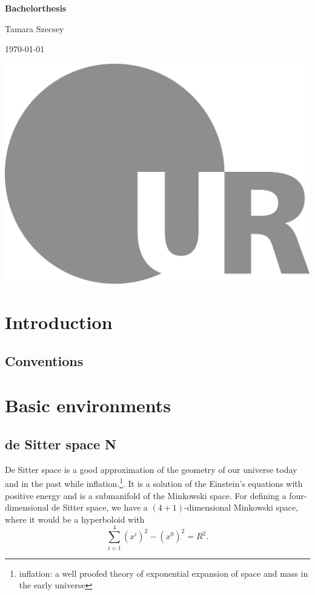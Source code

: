 \documentclass[english, a4, 12pt]{scrartcl}
\begin{document}
	
	\begin{titlepage}
		\begin{minipage}[c][\textheight][c]{\textwidth}
			\begin{center}
				{ \Huge \textbf{Bachelorthesis} }
				
				\vspace*{1cm}
				{\Large Tamara Szecsey}
				
				\vspace*{1cm}
				{\Large \today}
				
				\vspace*{4cm}
				\hspace*{1cm} \includegraphics[height=30ex]{LOGO_UR}
			\end{center}
		\end{minipage}
	\end{titlepage}
	
\tableofcontents	
\clearpage	
\section{Introduction}
	\subsection{Conventions}
\section{Basic environments}
	
	 

	\subsection{de Sitter space \textbf{N}} 
		De Sitter space is a good approximation of the geometry of our universe today and in the past while inflation.\footnote{inflation: a well proofed theory of exponential expansion of space and mass in the early universe}. It is a solution of the Einstein's equations with positive energy and is a submanifold of the Minkowski space.
		For defining a four-dimensional de Sitter space, we have a $(4+1)$-dimensional Minkowski space, where it would be a hyperboloid with 
		\begin{equation}
			\sum_{i=1}^4 (x^i)^2 - (x^0)^2 = R^2.			
		\end{equation}
	 	
\end{document}
